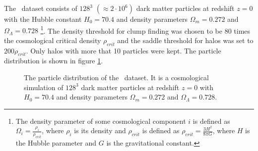 The \cosmo\ dataset consists of $128^{3}$ $(\approx 2\cdot10^6)$ dark matter particles at redshift $z=0$ with the Hubble constant $H_0 = 70.4$ and density parameters $\Omega_m = 0.272$ and $\Omega_\Lambda=0.728$
\footnote{
	The density parameter of some cosmological component $i$ is defined as $\Omega_i  = \frac{\rho_i}{\rho_{crit}}$, where $\rho_i$ is its density and  $\rho_{crit}$ is defined as $\rho_{crit} = \frac{3 H^2}{8\pi G}$, where $H$ is the Hubble parameter and $G$ is the gravitational constant.
}.
The density threshold for clump finding was chosen to be 80 times the cosmological critical density $\rho_{crit}$  and the saddle threshold for halos was set to $200\rho_{crit}$.
Only halos with more that 10 particles were kept.
The particle distribution is shown in figure \ref{fig:cosmo_origin}.







\begin{figure}[!htb]
	\centering
	\caption{
		The particle distribution of the \cosmo\ dataset.
		It is a cosmological simulation of $128^3$ dark matter particles at redshift $z=0$ with $H_0 = 70.4$ and density parameters $\Omega_m = 0.272$ and $\Omega_\Lambda=0.728$.
	}%
	\label{fig:cosmo_origin}
\end{figure}

